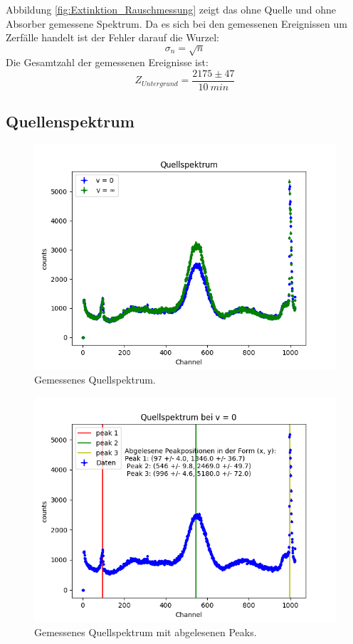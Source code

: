 \documentclass[12pt,a4paper]{article}
\begin{document}
Abbildung \ref{fig:Extinktion_Rauschmessung} zeigt das ohne Quelle und ohne Absorber gemessene Spektrum. Da es sich bei den gemessenen Ereignissen um Zerfälle handelt ist der Fehler darauf die Wurzel:
\begin{equation*}
\sigma _{n} = \sqrt{n}
\end{equation*}
Die Gesamtzahl der gemessenen Ereignisse ist:
\begin{equation*}
Z_{Untergrund} = \dfrac{2175 \pm 47}{\SI{10}{min}}
\end{equation*}

\subsection{Quellenspektrum}
\begin{figure}
\centering
\includegraphics[scale=0.8]{Bilder/Quellspektrum/v0_und_vinf.png}
\caption{Gemessenes Quellspektrum.}
\label{fig:Quellspektrum}
\end{figure}

\begin{figure}
\centering
\includegraphics[scale=0.8]{Bilder/Quellspektrum/Spektrum_abgelesene_Peaks.png}
\caption{Gemessenes Quellspektrum mit abgelesenen Peaks.}
\label{fig:Quellspektrum_abgelesenePeaks}
\end{figure}
\end{document}
